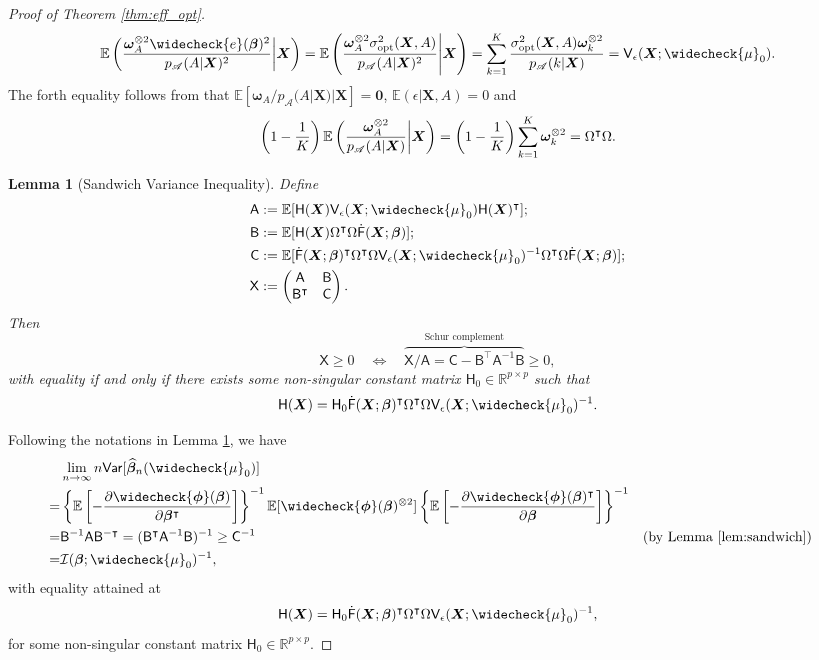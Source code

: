 \documentclass[11pt]{article}
\numberwithin{equation}{section}
\newtheorem{lem}{Lemma}[section]
\theoremstyle{definition}
\theoremstyle{remark}
\newcommand{\bX}{\bm{X}}
\newcommand{\bbeta}{\bm{\beta}}
\newcommand{\bomega}{\bm{\omega}}
\newcommand{\bphi}{\bm{\phi}}
\newcommand{\bbE}{\mathbb{E}}
\newcommand{\bbR}{\mathbb{R}}
\newcommand{\cI}{\mathcal{I}}
\newcommand{\sA}{\mathscr{A}}
\newcommand{\sfA}{\mathsf{A}}
\newcommand{\sfB}{\mathsf{B}}
\newcommand{\sfC}{\mathsf{C}}
\newcommand{\sfF}{\mathsf{F}}
\newcommand{\sfH}{\mathsf{H}}
\newcommand{\sfV}{\mathsf{V}}
\newcommand{\sfX}{\mathsf{X}}
\newcommand{\sfvar}{\mathsf{Var}}
\newcommand{\bzero}{\mathbf{0}}	%
\newcommand{\opt}{\mathrm{opt}}
\begin{document}
\begin{proof}[Proof of Theorem \ref{thm:eff_opt}]
	\[ \bbE\left( {\bomega_{A}^{\otimes 2}\widecheck{e}(\bbeta)^{2} \over p_{\sA}(A|\bX)^{2}}\middle|\bX \right) = \bbE\left( {\bomega_{A}^{\otimes 2}\sigma_{\opt}^{2}(\bX,A) \over p_{\sA}(A|\bX)^{2}}\middle|\bX \right) = \sum_{k=1}^{K}{\sigma^{2}_{\opt}(\bX,A)\bomega_{k}^{\otimes 2} \over p_{\sA}(k|\bX)} = \sfV_{\epsilon}(\bX;\widecheck{\mu}_{0}). \]
	The forth equality follows from that $ \bbE[\bomega_{A}/p_{\sA}(A|\bX)|\bX] = \bzero $, $ \bbE(\epsilon|\bX,A) = 0 $ and
	\[ \left( 1 - {1 \over K} \right)\bbE\left( {\bomega_{A}^{\otimes 2} \over p_{\sA}(A|\bX)}\middle|\bX \right) = \left( 1 - {1 \over K} \right)\sum_{k=1}^{K}\bomega_{k}^{\otimes 2} = \Omega^{\intercal}\Omega. \]
	\begin{lem}[Sandwich Variance Inequality]\label{lem:sandwich}
		Define
		\begin{align*}
			\sfA &:= \bbE[\sfH(\bX)\sfV_{\epsilon}(\bX;\widecheck{\mu}_{0})\sfH(\bX)^{\intercal}];\\
			\sfB &:= \bbE[\sfH(\bX)\Omega^{\intercal}\Omega\dot{\sfF}(\bX;\bbeta)];\\
			\sfC &:= \bbE[\dot{\sfF}(\bX;\bbeta)^{\intercal}\Omega^{\intercal}\Omega\sfV_{\epsilon}(\bX;\widecheck{\mu}_{0})^{-1}\Omega^{\intercal}\Omega\dot{\sfF}(\bX;\bbeta)];\\
			\sfX &:= \begin{pmatrix}
				\sfA & \sfB\\
				\sfB^{\intercal} & \sfC
			\end{pmatrix}.
		\end{align*}
		Then
		\[ \sfX \ge 0 \quad \Leftrightarrow \quad \overbrace{\sfX/\sfA = \sfC - \sfB^{\intercal}\sfA^{-1}\sfB}^{\text{Schur complement}} \ge 0, \]
		with equality if and only if there exists some non-singular constant matrix $ \sfH_{0} \in \bbR^{p \times p} $ such that
		\[ \sfH(\bX) = \sfH_{0}\dot{\sfF}(\bX;\bbeta)^{\intercal}\Omega^{\intercal}\Omega\sfV_{\epsilon}(\bX;\widecheck{\mu}_{0})^{-1}. \]
	\end{lem}

	\noindent Following the notations in Lemma \ref{lem:sandwich}, we have
	\begin{align*}
		&\lim_{n\to\infty}n\sfvar[\widehat{\bbeta}_{n}(\widecheck{\mu}_{0})] \\
		=& \left\{ \bbE \left[-{\partial \widecheck{\bphi}(\bbeta)\over \partial \bbeta^{\intercal}}\right]\right\}^{-1}\bbE [\widecheck{\bphi}(\bbeta)^{\otimes 2}]\left\{ \bbE \left[-{\partial \widecheck{\bphi}(\bbeta)^{\intercal}\over \partial \bbeta}\right]\right\}^{-1} \\
		=& \sfB^{-1}\sfA\sfB^{-\intercal} = (\sfB^{\intercal}\sfA^{-1}\sfB)^{-1} \ge \sfC^{-1} &&(\text{by Lemma \ref{lem:sandwich}}) \\
		=& \cI(\bbeta;\widecheck{\mu}_{0})^{-1},
	\end{align*}
	with equality attained at
	\[ \sfH(\bX) = \sfH_{0}\dot{\sfF}(\bX;\bbeta)^{\intercal}\Omega^{\intercal}\Omega\sfV_{\epsilon}(\bX;\widecheck{\mu}_{0})^{-1}, \]
	for some non-singular constant matrix $ \sfH_{0} \in \bbR^{p \times p} $.
\end{proof}
\end{document}
